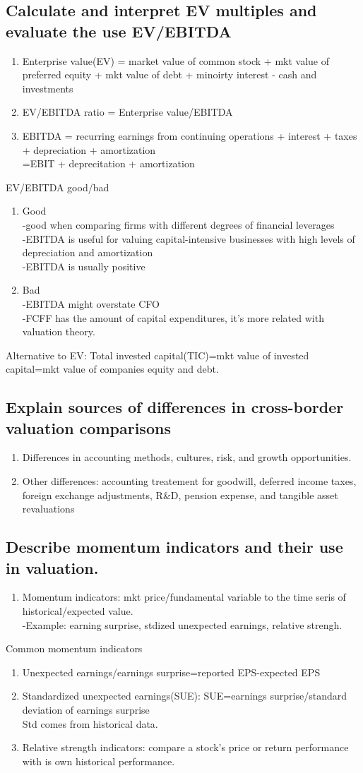 \documentclass{article}
\newcommand{\be}{\begin{enumerate}}
\newcommand{\ee}{\end{enumerate}}
\begin{document}
\subsection{Calculate and interpret EV multiples and evaluate the use EV/EBITDA}
\be
    \item Enterprise value(EV) = market value of common stock + mkt value of preferred equity
+ mkt value of debt + minoirty interest - cash and investments
    \item EV/EBITDA ratio = Enterprise value/EBITDA
    \item EBITDA = recurring earnings from continuing operations + interest
        + taxes + depreciation + amortization
        \\=EBIT + deprecitation + amortization
\ee
EV/EBITDA good/bad
\be
    \item Good
        \\-good when comparing firms with different degrees of financial leverages
        \\-EBITDA is useful for valuing capital-intensive businesses with high levels of depreciation and amortization
        \\-EBITDA is usually positive
    \item Bad
        \\-EBITDA might overstate CFO
        \\-FCFF has the amount of capital expenditures, it's more related
        with valuation theory.
\ee
Alternative to EV: Total invested capital(TIC)=mkt value of invested capital=mkt value of 
companies equity and debt.
\subsection{Explain sources of differences in cross-border valuation comparisons}
\be
    \item Differences in accounting methods, cultures, risk, and growth opportunities.
    \item Other differences: accounting treatement for goodwill, deferred income taxes, foreign
        exchange adjustments, R\&D, pension expense, and tangible asset revaluations
\ee
\subsection{Describe momentum indicators and their use in valuation.}
\be
    \item Momentum indicators: mkt price/fundamental variable to the time seris of historical/expected
    value. 
    \\-Example: earning surprise, stdized unexpected earnings, relative strengh.
\ee
Common momentum indicators
\be
    \item Unexpected earnings/earnings surprise=reported EPS-expected EPS
    \item Standardized unexpected earnings(SUE):
        SUE=earnings surprise/standard deviation of earnings surprise
    \\Std comes from historical data.
    \item Relative strength indicators: compare a stock's price or return performance
        with is own historical performance.
\ee
\end{document}
